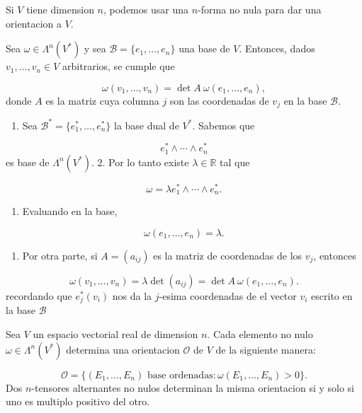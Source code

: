 \begin{bookremark}{}
Si $V$ tiene dimension $n$, podemos usar una $n$-forma no nula para dar una orientacion a $V$.

\end{bookremark}
\begin{booklemma}{}
Sea $\omega\in\Lambda^n(V^*)$ y sea $\mathcal B=\{e_1,\ldots,e_n\}$ una base de $V$. Entonces, dados $v_1,\ldots,v_n\in V$ arbitrarios, se cumple que

\[
\omega(v_1,\ldots,v_n)=\det A\ \omega(e_1,\ldots,e_n),
\]
donde $A$ es la matriz cuya columna $j$ son las coordenadas de $v_j$ en la base $\mathcal B$.

\end{booklemma}
\begin{bookproof}{}
\begin{enumerate}
\item Sea $\mathcal B^*=\{e_1^*,\ldots,e_n^*\}$ la base dual de $V^*$. Sabemos que
\end{enumerate}
\[
e_1^*\wedge\cdots\wedge e_n^*
\]
es base de $\Lambda^n(V^*)$. 2. Por lo tanto existe $\lambda\in\mathbb R$ tal que

\[
\omega=\lambda e_1^*\wedge\cdots\wedge e_n^*.
\]
\begin{enumerate}[start=3]
\item Evaluando en la base,
\end{enumerate}
\[
\omega(e_1,\ldots,e_n)=\lambda.
\]
\begin{enumerate}[start=4]
\item Por otra parte, si $A=(a_{ij})$ es la matriz de coordenadas de los $v_j$, entonces
\end{enumerate}
\[
\omega(v_1,\ldots,v_n)=\lambda\det(a_{ij})=\det A\ \omega(e_1,\ldots,e_n).
\]
recordando que $e_{j}^{*}(v_{i})$ nos da la $j$-esima coordenadas de el vector $v_{i}$ escrito en la base $\mathcal{B}$

\bookqed
\end{bookproof}
\label{blk:543d91}
\begin{bookproposition}{}
Sea $V$ un espacio vectorial real de dimension $n$. Cada elemento no nulo $\omega\in\Lambda^n(V^*)$ determina una orientacion $\mathcal O$ de $V$ de la siguiente manera:

\[
\mathcal O=\{(E_1,\ldots,E_n)\text{ base ordenadas}:\omega(E_1,\ldots,E_n)>0\}.
\]
Dos $n$-tensores alternantes no nulos determinan la misma orientacion si y solo si uno es multiplo positivo del otro.

\end{bookproposition}
